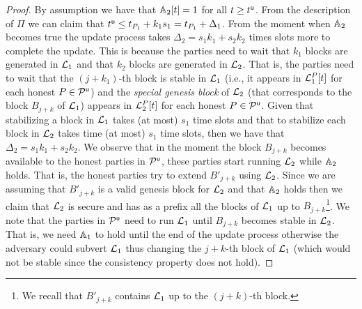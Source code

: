 \begin{proof}
By assumption we have that $\mathbb{A}_2[t]=1$ for all $t\geq t^{\mathsf{u}}$. From the description of $\Pi$ we can claim that $t^{\mathsf{u}} \leq t_{P_1}+k_1 s_1=t_{P_1}+\Delta_1$.
From the moment when $\mathbb{A}_2$ becomes true the update process takes $\Delta_2=s_1 k_1 + s_2 k_2$  times slots more to complete the update.
This is because the parties need to wait that $k_1$ blocks are generated in $\mathcal{L}_1$ and that $k_2$ blocks are generated in $\mathcal{L}_2$. 
That is, the parties need to wait that the $(j+k_1)$-th block is stable in $\mathcal{L}_1$ (i.e., 
it appears in $\mathcal{L}_1^P[t]$ for each honest $P\in\mathcal{P}^\mathsf{u}$) and the \emph{special genesis block} of $\mathcal{L}_2$ (that corresponds to the block $B_{j+k}$ of $\mathcal{L}_1$) appears 
in $\mathcal{L}_2^P[t]$ for each honest $P\in\mathcal{P}^\mathsf{u}$. Given that stabilizing a block in $\mathcal{L}_1$ takes (at most) $s_1$ time slots and that to stabilize
each block in $\mathcal{L}_2$ takes time (at most) $s_1$ time slots, then we have that $\Delta_2=s_1 k_1 + s_2 k_2$.
We observe that in the moment the block $B_{j+k}$ becomes available to the honest parties in $\mathcal{P}^\mathsf{u}$, these parties start running $\mathcal{L}_2$ while $\mathbb{A}_2$ holds.
That is, the honest parties try to extend $B'_{j+k}$ using $\mathcal{L}_2$. Since we are assuming that $B'_{j+k}$  is a valid genesis block for $\mathcal{L}_2$ and 
that $\mathbb{A}_2$ holds then we claim that $\mathcal{L}_2$ is secure and has as a prefix all the blocks of $\mathcal{L}_1$ up to $B_{j+k}$\footnote{We recall that $B'_{j+k}$
contains $\mathcal{L}_1$ up to the $(j+k)$-th block.}. We note that the parties in $\mathcal{P}^\mathsf{u}$ need to run $\mathcal{L}_1$ until $B_{j+k}$ becomes stable in $\mathcal{L}_2$. That is, we need $\mathbb{A}_1$ to
hold until the end of the update process otherwise the adversary could subvert $\mathcal{L}_1$ thus changing the $j+k$-th block of $\mathcal{L}_1$ (which would not be stable
since the consistency property does not hold).

\end{proof}
